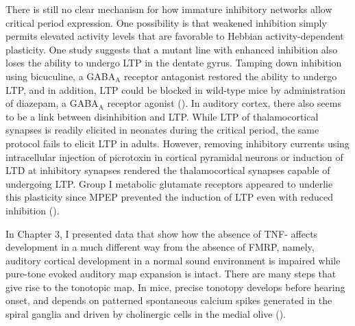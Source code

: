 There is still no clear mechanism for how immature inhibitory networks allow critical period expression. One possibility is that weakened inhibition simply permits elevated activity levels that are favorable to Hebbian activity-dependent plasticity. One study suggests that a mutant line with enhanced inhibition also loses the ability to undergo LTP in the dentate gyrus. Tamping down inhibition using bicuculine, a GABA$_\mathrm{A}$ receptor antagonist restored the ability to undergo LTP, and in addition, LTP could be blocked in wild-type mice by administration of diazepam, a GABA$_\mathrm{A}$ receptor agonist (\cite{Levkovitz1999}). In auditory cortex, there also seems to be a link between disinhibition and LTP. While LTP of thalamocortical synapses is readily elicited in neonates during the critical period, the same protocol fails to elicit LTP in adults. However, removing inhibitory currents using intracellular injection of picrotoxin in cortical pyramidal neurons or induction of LTD at inhibitory synapses rendered the thalamocortical synapses capable of undergoing LTP. Group I metabolic glutamate receptors appeared to underlie this plasticity since MPEP prevented the induction of LTP even with reduced inhibition (\cite{Chun2013}).

In Chapter 3, I presented data that show how the absence of TNF-\textalpha{} affects development in a much different way from the absence of FMRP, namely, auditory cortical development in a normal sound environment is impaired while pure-tone evoked auditory map expansion is intact. There are many steps that give rise to the tonotopic map. In mice, precise tonotopy develops before hearing onset, and depends on patterned spontaneous calcium spikes generated in the spiral ganglia and driven by cholinergic cells in the medial olive (\cite{Elgoyhen1994, Cao2008, Clause2014}).

